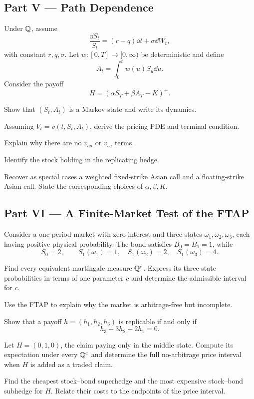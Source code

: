 \subsection*{Part V --- Path Dependence}

\begin{exercise}
Under \(\mathbb{Q}\), assume
\[
\frac{\dd S_t}{S_t}=(r-q)\dd t+\sigma\dd W_t,
\]
with constant \(r,q,\sigma\). Let \(w:[0,T]\to[0,\infty)\) be deterministic
and define
\[
A_t=\int_0^t w(u)S_u\dd u.
\]
Consider the payoff
\[
H=(\alpha S_T+\beta A_T-K)^+.
\]
\begin{exparts}
  \item Show that \((S_t,A_t)\) is a Markov state and write its dynamics.
  \item Assuming \(V_t=v(t,S_t,A_t)\), derive the pricing PDE and terminal
  condition.
  \item Explain why there are no \(v_{aa}\) or \(v_{sa}\) terms.
  \item Identify the stock holding in the replicating hedge.
  \item Recover as special cases a weighted fixed-strike Asian call and a
  floating-strike Asian call. State the corresponding choices of
  \(\alpha,\beta,K\).
\end{exparts}
\end{exercise}

\subsection*{Part VI --- A Finite-Market Test of the FTAP}

\begin{exercise}
Consider a one-period market with zero interest and three states
\(\omega_1,\omega_2,\omega_3\), each having positive physical probability.
The bond satisfies \(B_0=B_1=1\), while
\[
S_0=2,
\qquad
S_1(\omega_1)=1,\quad
S_1(\omega_2)=2,\quad
S_1(\omega_3)=4.
\]
\begin{exparts}
  \item Find every equivalent martingale measure
  \(\mathbb{Q}^c\). Express its three state probabilities in terms of one
  parameter \(c\) and determine the admissible interval for \(c\).
  \item Use the FTAP to explain why the market is arbitrage-free but
  incomplete.
  \item Show that a payoff \(h=(h_1,h_2,h_3)\) is replicable if and only if
  \[
  h_3-3h_2+2h_1=0.
  \]
  \item Let \(H=(0,1,0)\), the claim paying only in the middle state.
  Compute its expectation under every \(\mathbb{Q}^c\) and determine the full
  no-arbitrage price interval when \(H\) is added as a traded claim.
  \item Find the cheapest stock--bond superhedge and the most expensive
  stock--bond subhedge for \(H\). Relate their costs to the endpoints of the
  price interval.
\end{exparts}
\end{exercise}
